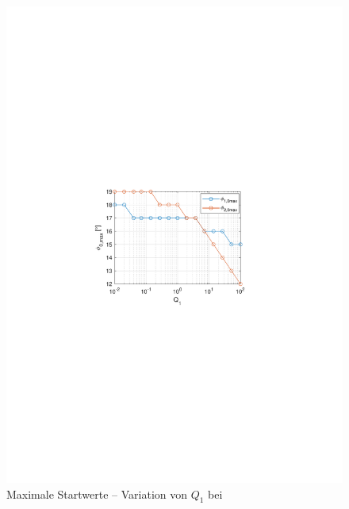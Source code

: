 \begin{figure}[htb]
	\centering
		\includegraphics[width=1.00\textwidth]{Bilder/QRVariation/ap4/q1 phi12.pdf}
		\caption{Maximale Startwerte -- Variation von $Q_1$ bei \apv}
	\label{fig:qrap4q1}
\end{figure}

